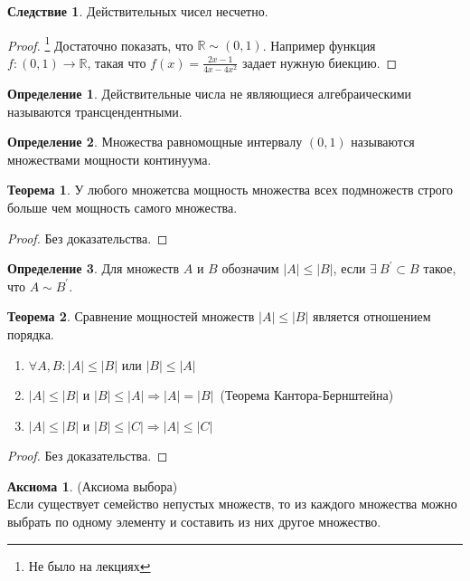\documentclass[a4paper, 12pt]{article}
\newcommand{\R}{\mathbb{R}}
\theoremstyle{definition}
\newtheorem*{definition}{Определение}
\newtheorem*{theorem}{Теорема}
\newtheorem*{consequense}{Следствие}
\newtheorem*{axiom}{Аксиома}
\begin{document}
        \begin{consequense}
            Действительных чисел несчетно.
        \end{consequense} 
        \begin{proof}\footnote{Не было на лекциях}
            Достаточно показать, что $\R \sim (0,1)$. Например функция\\
            $f:(0,1)\to \R$, такая что $f(x)=\frac{2x-1}{4x-4x^2}$ задает нужную биекцию.
        \end{proof} 
        \begin{definition}
            Действительные числа не являющиеся алгебраическими называются трансцендентными.
        \end{definition} 
        \begin{definition}
            Множества равномощные интервалу $(0,1)$ называются множествами мощности континуума.
        \end{definition} 
        \begin{theorem}
            У любого множетсва мощность множества всех подмножеств строго больше чем мощность самого множества.
        \end{theorem}
        \begin{proof}
            Без доказательства.
        \end{proof} 
        \begin{definition}
            Для множеств $A$ и $B$ обозначим $|A|\leq |B|$, если $\exists \ B^{\prime} \subset B$ такое, что $A\sim B^{\prime}$.
        \end{definition} 
        \begin{theorem}
            Сравнение мощностей множеств $|A|\leq |B|$ является отношением порядка.
            \begin{enumerate}
                \item $\forall A,B: |A|\leq |B|$ или $|B|\leq |A|$ 
                \item $|A|\leq |B|$ и $|B|\leq |A| \Rightarrow |A|=|B|$\ (Теорема Кантора-Бернштейна)
                \item $|A|\leq |B|$ и $|B|\leq |C| \Rightarrow |A|\leq |C|$
            \end{enumerate}
        \end{theorem}
        \begin{proof}
            Без доказательства.
        \end{proof}
        \begin{axiom}(Аксиома выбора)\\
            Если существует семейство непустых множеств, то из каждого множества можно выбрать по одному элементу и составить из них другое множество.
        \end{axiom}
\end{document}
